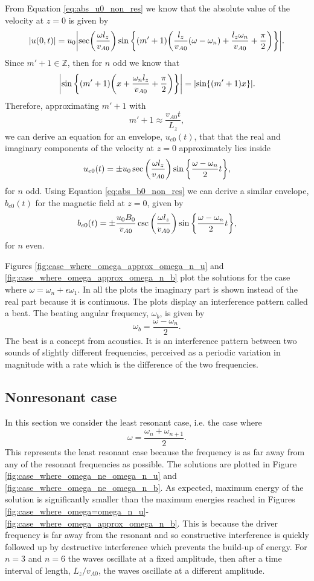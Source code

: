 From Equation \eqref{eq:abs_u0_non_res} we know that the absolute value of the velocity at $z=0$ is given by
\[
    |u(0,t)|=u_0\abs{\sec(\frac{\omega l_z}{v_{A0}})\sin\qty{(m'+1)\qty(\frac{l_z}{v_{A0}}(\omega-\omega_n)+\frac{l_z \omega_n}{v_{A0}}+\frac{\pi}{2})}}.
\]
Since $m'+1\in\mathds{Z}$, then for $n$ odd we know that
\[\abs{\sin\qty{(m'+1)\qty(x + \frac{\omega_n l_z}{v_{A0}}+\frac{\pi}{2})}}=\abs{\sin\{(m'+1)x\}}.\]
Therefore, approximating $m'+1$ with 
\[m'+1\approx \frac{v_{A0} t}{L_z},\]
we can derive an equation for an envelope, $u_{e0}(t)$, that that the real and imaginary components of the velocity at $z=0$ approximately lies inside
\begin{equation}
    \label{eq:u0_envelope}
    u_{e0}(t) = \pm u_0\sec\qty(\frac{\omega l_z}{v_{A0}})\sin\qty{\frac{\omega - \omega_n}{2}t},
\end{equation}
for $n$ odd.
Using Equation \eqref{eq:abs_b0_non_res} we can derive a similar envelope, $b_{e0}(t)$ for the magnetic field at $z=0$, given by
\begin{equation}
    \label{eq:b0_envelope}
    b_{e0}(t)=\pm \frac{u_0B_0}{v_{A0}}\csc\qty(\frac{\omega l_z}{v_{A0}})\sin\qty{\frac{\omega - \omega_n}{2}t},
\end{equation}
for $n$ even.

Figures \ref{fig:case_where_omega_approx_omega_n_u} and \ref{fig:case_where_omega_approx_omega_n_b} plot the solutions for the case where $\omega=\omega_n+\epsilon \omega_1$. In all the plots the imaginary part is shown instead of the real part because it is continuous. The plots display an interference pattern called a beat. The beating angular frequency, $\omega_b$, is given by
\begin{equation}
    \omega_b = \frac{\omega - \omega_n}{2}.
\end{equation}
The beat is a concept from acoustics. It is an interference pattern between two sounds of slightly different frequencies, perceived as a periodic variation in magnitude with a rate which is the difference of the two frequencies.

\subsection{Nonresonant case}
\label{sec:case_where_omega_ne_omega_n}

In this section we consider the least resonant case, i.e. the case where
\[\omega = \frac{\omega_{n}+\omega_{n+1}}{2}.\]
This represents the least resonant case because the frequency is as far away from any of the resonant frequencies as possible. The solutions are plotted in Figure \ref{fig:case_where_omega_ne_omega_n_u} and \ref{fig:case_where_omega_ne_omega_n_b}. As expected, maximum energy of the solution is significantly smaller than the maximum energies reached in Figures \ref{fig:case_where_omega=omega_n_u}-\ref{fig:case_where_omega_approx_omega_n_b}. This is because the driver frequency is far away from the resonant and so constructive interference is quickly followed up by destructive interference which prevents the build-up of energy. For $n=3$ and $n=6$ the waves oscillate at a fixed amplitude, then after a time interval of length, $L_z / v_{A0}$, the waves oscillate at a different amplitude.

